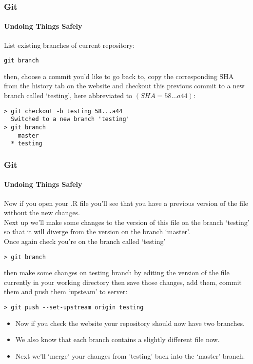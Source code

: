 \documentclass[xcolor=dvipsnames]{beamer}
\begin{document}
\begin{frame}[fragile]
\frametitle{Git}
\framesubtitle{Undoing Things Safely}
List existing branches of current repository:
\begin{block}{}
\begin{lstlisting}
git branch
\end{lstlisting}
\end{block}
then, choose a commit you'd like to go back to, copy the corresponding SHA from the history tab on the website and checkout this previous commit to a new branch called `testing', here abbreviated to $(SHA = 58...a44)$:
\begin{block}{}
\begin{lstlisting}
> git checkout -b testing 58...a44
  Switched to a new branch 'testing'
> git branch
    master
  * testing
\end{lstlisting}
\end{block}

\end{frame}

\begin{frame}[fragile]
\frametitle{Git}
\framesubtitle{Undoing Things Safely}
Now if you open your .R file you'll see that you have a previous version of the file without the new changes.\\
Next up we'll make some changes to the version of this file on the branch `testing' so that it will diverge from the version on the branch `master'.\\
Once again check you're on the branch called `testing'
\begin{block}{}
\begin{lstlisting}
> git branch
\end{lstlisting}
\end{block}
then make some changes on testing branch by editing the version of the file currently in your working directory then save those changes, add them, commit them and push them `upsteam' to server:
\begin{block}{}
\begin{lstlisting}
> git push --set-upstream origin testing
\end{lstlisting}
\end{block}

\end{frame}

\begin{frame}[fragile]
\begin{itemize}
\item Now if you check the website your repository should now have two branches.
\newline
\newline
\item We also know that each branch contains a slightly different file now.
\newline
\newline
\item Next we'll `merge' your changes from 'testing' back into the `master' branch.
\end{itemize}
\end{frame}
\end{document}
